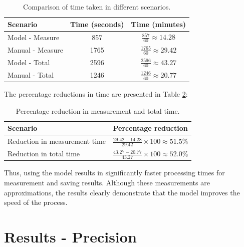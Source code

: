 \begin{table}[H]
    \centering
    \caption{Comparison of time taken in different scenarios.}
    
    \begin{tabular}{lcc}
        \toprule
        \textbf{Scenario} & \textbf{Time (seconds)} & \textbf{Time (minutes)} \\
        \midrule
        Model - Measure    & 857  & $\frac{857}{60} \approx 14.28$ \\
        Manual - Measure   & 1765 & $\frac{1765}{60} \approx 29.42$ \\
        Model - Total      & 2596 & $\frac{2596}{60} \approx 43.27$ \\
        Manual - Total     & 1246 & $\frac{1246}{60} \approx 20.77$ \\
        \bottomrule
    \end{tabular}
    \label{tab:time_comparison}
\end{table}



The percentage reductions in time are presented in Table \ref{tab:percentage_reduction}:



\begin{table}[H]
    \centering
    \caption{Percentage reduction in measurement and total time.}

    \begin{tabular}{lc}
        \toprule
        \textbf{Scenario} & \textbf{Percentage reduction} \\
        \midrule
        Reduction in measurement time & $\frac{29.42 - 14.28}{29.42} \times 100 \approx 51.5\%$ \\
        Reduction in total time & $\frac{43.27 - 20.77}{43.27} \times 100 \approx 52.0\%$ \\
        \bottomrule
    \end{tabular}
    \label{tab:percentage_reduction}
\end{table}


Thus, using the model results in significantly faster processing times for measurement and saving results. Although these measurements are approximations, the results clearly demonstrate that the model improves the speed of the process.

\section{Results - Precision}\label{sec:resprec}


